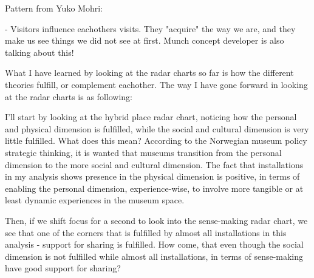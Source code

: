 Pattern from Yuko Mohri:


- Visitors influence eachothers visits. They "acquire" the way we are, and they make us see things we did not see at first. Munch concept developer is also talking about this!


What I have learned by looking at the radar charts so far is how the different theories fulfill, or complement eachother. The way I have gone forward in looking at the radar charts is as following:
\par I'll start by looking at the hybrid place radar chart, noticing how the personal and physical dimension is fulfilled, while the social and cultural dimension is very little fulfilled. What does this mean? According to the Norwegian museum policy strategic thinking, it is wanted that museums transition from the personal dimension to the more social and cultural dimension. The fact that installations in my analysis shows presence in the physical dimension is positive, in terms of enabling the personal dimension, experience-wise, to involve more tangible or at least dynamic experiences in the museum space.
\par Then, if we shift focus for a second to look into the sense-making radar chart, we see that one of the corners that is fulfilled by almost all installations in this analysis - support for sharing is fulfilled. How come, that even though the social dimension is not fulfilled while almost all installations, in terms of sense-making have good support for sharing? 